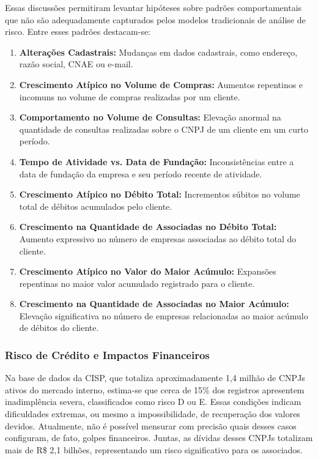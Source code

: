 \documentclass[12pt,a4paper]{article}
\begin{document}
Essas discussões permitiram levantar hipóteses sobre padrões comportamentais que não são adequadamente capturados pelos modelos tradicionais de análise de risco. Entre esses padrões destacam-se:
\begin{enumerate}
    \item \textbf{Alterações Cadastrais:} Mudanças em dados cadastrais, como endereço, razão social, CNAE ou e-mail.
    \item \textbf{Crescimento Atípico no Volume de Compras:} Aumentos repentinos e incomuns no volume de compras realizadas por um cliente.
    \item \textbf{Comportamento no Volume de Consultas:} Elevação anormal na quantidade de consultas realizadas sobre o CNPJ de um cliente em um curto período.
    \item \textbf{Tempo de Atividade vs. Data de Fundação:} Inconsistências entre a data de fundação da empresa e seu período recente de atividade.
    \item \textbf{Crescimento Atípico no Débito Total:} Incrementos súbitos no volume total de débitos acumulados pelo cliente.
    \item \textbf{Crescimento na Quantidade de Associadas no Débito Total:} Aumento expressivo no número de empresas associadas ao débito total do cliente.
    \item \textbf{Crescimento Atípico no Valor do Maior Acúmulo:} Expansões repentinas no maior valor acumulado registrado para o cliente.
    \item \textbf{Crescimento na Quantidade de Associadas no Maior Acúmulo:} Elevação significativa no número de empresas relacionadas ao maior acúmulo de débitos do cliente.
\end{enumerate}

\subsubsection{Risco de Crédito e Impactos Financeiros}

Na base de dados da CISP, que totaliza aproximadamente 1,4 milhão de CNPJs ativos do mercado interno, estima-se que cerca de 15\% dos registros apresentem inadimplência severa, classificados como risco D ou E. Essas condições indicam dificuldades extremas, ou mesmo a impossibilidade, de recuperação dos valores devidos. Atualmente, não é possível mensurar com precisão quais desses casos configuram, de fato, golpes financeiros. Juntas, as dívidas desses CNPJs totalizam mais de R\$ 2,1 bilhões, representando um risco significativo para os associados.
\end{document}
